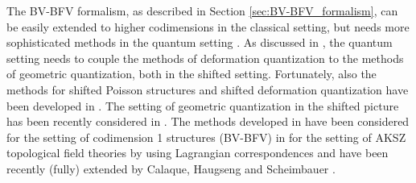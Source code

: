 \documentclass[11pt,colorinlistoftodos]{amsart}
\numberwithin{equation}{subsection}
\theoremstyle{plain}
\theoremstyle{definition}
\theoremstyle{remark}
\begin{document}
The BV-BFV formalism, as described in Section \ref{sec:BV-BFV_formalism}, can be easily extended to higher codimensions in the classical setting, but needs more sophisticated methods in the quantum setting \cite{CMR1,Moshayedi2021}. As discussed in \cite{Moshayedi2021}, the quantum setting needs to couple the methods of deformation quantization to the methods of geometric quantization, both in the shifted setting. Fortunately, also the methods for shifted Poisson structures and shifted deformation quantization have been developed in \cite{CalaquePantevToenVaquieVezzosi2017,Safronov2017_lectures}. The setting of geometric quantization in the shifted picture has been recently considered in \cite{Safronov2020}. The methods developed in \cite{PantevToenVaquieVezzosi2013} have been considered for the setting of codimension 1 structures (BV-BFV) in \cite{Calaque2015} for the setting of AKSZ topological field theories by using Lagrangian correspondences and have been recently (fully) extended by Calaque, Haugseng and Scheimbauer \cite{CalaqueHaugsengScheimbauer}.\\
\end{document}
